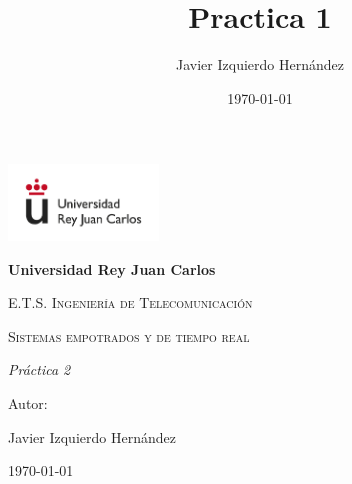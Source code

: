 \documentclass[12pt, a4paper]{report}
\title{Practica 1}
\author{Javier Izquierdo Hernández}
\date{\today}
\begin{document}
	\begin{titlepage}
		\centering
		{\includegraphics[width=0.3\textwidth]{logo}\par}
		\vspace{1cm}
		{\bfseries\LARGE Universidad Rey Juan Carlos \par}
		\vspace{1cm}
		{\scshape\Large E.T.S. Ingeniería de Telecomunicación \par}
		\vspace{3cm}
		{\scshape\Huge Sistemas empotrados y de tiempo real \par}
		\vspace{3cm}
		{\itshape\Large Práctica 2 \par}
		\vfill
		{\Large Autor: \par}
		{\Large Javier Izquierdo Hernández \par}
		\vfill
		{\Large \today \par}
	\end{titlepage}
	
	\newpage
\end{document}
